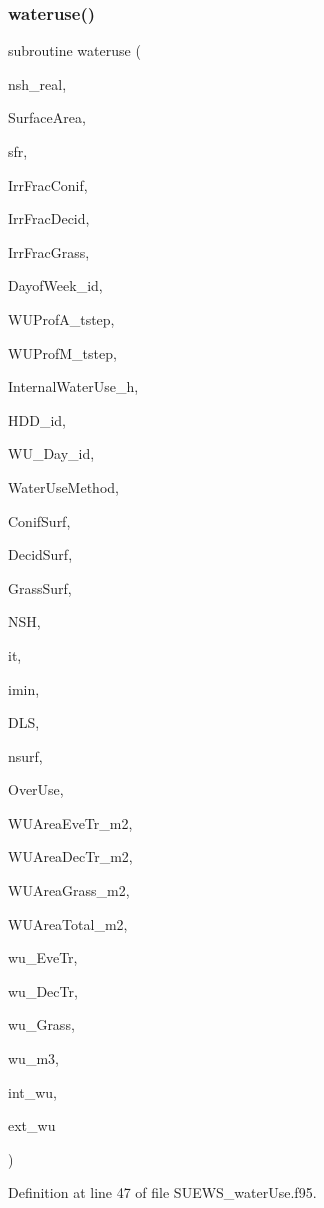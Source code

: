 \subsubsection{\texorpdfstring{wateruse()}{wateruse()}}
{\footnotesize\ttfamily subroutine wateruse (\begin{DoxyParamCaption}\item[{real(kind(1d0)), intent(in)}]{nsh\+\_\+real,  }\item[{real(kind(1d0)), intent(in)}]{Surface\+Area,  }\item[{real(kind(1d0)), dimension(nsurf), intent(in)}]{sfr,  }\item[{real(kind(1d0)), intent(in)}]{Irr\+Frac\+Conif,  }\item[{real(kind(1d0)), intent(in)}]{Irr\+Frac\+Decid,  }\item[{real(kind(1d0)), intent(in)}]{Irr\+Frac\+Grass,  }\item[{integer, dimension(3), intent(in)}]{Dayof\+Week\+\_\+id,  }\item[{real(kind(1d0)), dimension(24$\ast$nsh,2), intent(in)}]{W\+U\+Prof\+A\+\_\+tstep,  }\item[{real(kind(1d0)), dimension(24$\ast$nsh,2), intent(in)}]{W\+U\+Prof\+M\+\_\+tstep,  }\item[{real(kind(1d0)), intent(in)}]{Internal\+Water\+Use\+\_\+h,  }\item[{real(kind(1d0)), dimension(6), intent(in)}]{H\+D\+D\+\_\+id,  }\item[{real(kind(1d0)), dimension(9), intent(in)}]{W\+U\+\_\+\+Day\+\_\+id,  }\item[{integer, intent(in)}]{Water\+Use\+Method,  }\item[{integer, intent(in)}]{Conif\+Surf,  }\item[{integer, intent(in)}]{Decid\+Surf,  }\item[{integer, intent(in)}]{Grass\+Surf,  }\item[{integer, intent(in)}]{N\+SH,  }\item[{integer, intent(in)}]{it,  }\item[{integer, intent(in)}]{imin,  }\item[{integer, intent(in)}]{D\+LS,  }\item[{integer, intent(in)}]{nsurf,  }\item[{real(kind(1d0)), intent(inout)}]{Over\+Use,  }\item[{real(kind(1d0)), intent(out)}]{W\+U\+Area\+Eve\+Tr\+\_\+m2,  }\item[{real(kind(1d0)), intent(out)}]{W\+U\+Area\+Dec\+Tr\+\_\+m2,  }\item[{real(kind(1d0)), intent(out)}]{W\+U\+Area\+Grass\+\_\+m2,  }\item[{real(kind(1d0)), intent(out)}]{W\+U\+Area\+Total\+\_\+m2,  }\item[{real(kind(1d0)), intent(out)}]{wu\+\_\+\+Eve\+Tr,  }\item[{real(kind(1d0)), intent(out)}]{wu\+\_\+\+Dec\+Tr,  }\item[{real(kind(1d0)), intent(out)}]{wu\+\_\+\+Grass,  }\item[{real(kind(1d0)), intent(out)}]{wu\+\_\+m3,  }\item[{real(kind(1d0)), intent(out)}]{int\+\_\+wu,  }\item[{real(kind(1d0)), intent(out)}]{ext\+\_\+wu }\end{DoxyParamCaption})}



Definition at line 47 of file S\+U\+E\+W\+S\+\_\+water\+Use.\+f95.

